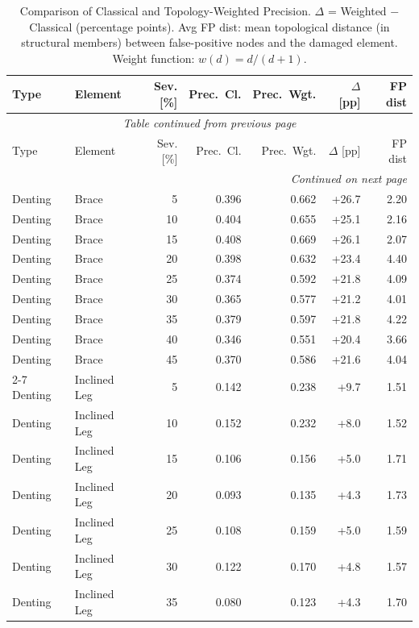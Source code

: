 \begin{longtable}{llrrrrr}
  \caption{Comparison of Classical and Topology-Weighted Precision. $\Delta$ = Weighted $-$ Classical (percentage points). Avg FP dist: mean topological distance (in structural members) between false-positive nodes and the damaged element. Weight function: $w(d)=d/(d+1)$.}\label{tab:precision_ponderada} \\
  \toprule
  Type & Element & Sev.[\%] & Prec.\ Cl. & Prec.\ Wgt. & $\Delta$ [pp] & FP dist \\
  \midrule
  \endfirsthead
  \multicolumn{7}{c}{\small\textit{Table continued from previous page}} \\[2pt]
  \toprule
  Type & Element & Sev.[\%] & Prec.\ Cl. & Prec.\ Wgt. & $\Delta$ [pp] & FP dist \\
  \midrule
  \endhead
  \midrule
  \multicolumn{7}{r}{\small\textit{Continued on next page}} \\
  \endfoot
  \bottomrule
  \endlastfoot
    Denting & Brace & 5 & 0.396 & 0.662 & +26.7 & 2.20 \\
    Denting & Brace & 10 & 0.404 & 0.655 & +25.1 & 2.16 \\
    Denting & Brace & 15 & 0.408 & 0.669 & +26.1 & 2.07 \\
    Denting & Brace & 20 & 0.398 & 0.632 & +23.4 & 4.40 \\
    Denting & Brace & 25 & 0.374 & 0.592 & +21.8 & 4.09 \\
    Denting & Brace & 30 & 0.365 & 0.577 & +21.2 & 4.01 \\
    Denting & Brace & 35 & 0.379 & 0.597 & +21.8 & 4.22 \\
    Denting & Brace & 40 & 0.346 & 0.551 & +20.4 & 3.66 \\
    Denting & Brace & 45 & 0.370 & 0.586 & +21.6 & 4.04 \\
    \cmidrule{2-7}
    Denting & Inclined Leg & 5 & 0.142 & 0.238 & +9.7 & 1.51 \\
    Denting & Inclined Leg & 10 & 0.152 & 0.232 & +8.0 & 1.52 \\
    Denting & Inclined Leg & 15 & 0.106 & 0.156 & +5.0 & 1.71 \\
    Denting & Inclined Leg & 20 & 0.093 & 0.135 & +4.3 & 1.73 \\
    Denting & Inclined Leg & 25 & 0.108 & 0.159 & +5.0 & 1.59 \\
    Denting & Inclined Leg & 30 & 0.122 & 0.170 & +4.8 & 1.57 \\
    Denting & Inclined Leg & 35 & 0.080 & 0.123 & +4.3 & 1.70 \\

\end{longtable}
